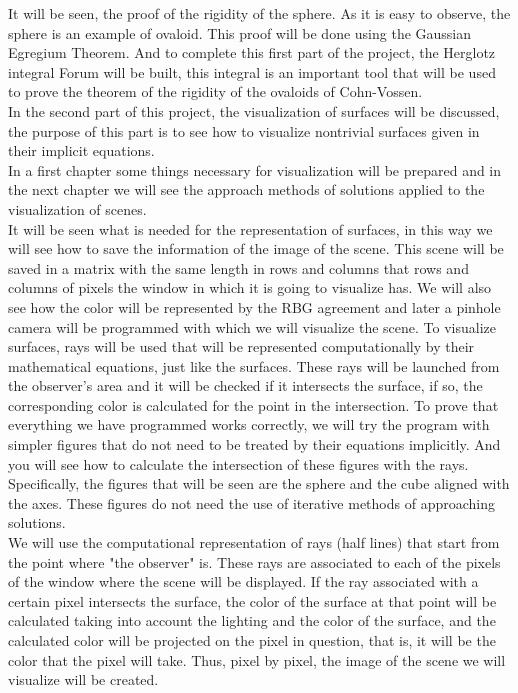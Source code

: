 It will be seen, the proof of the rigidity of the sphere. As it is easy to observe, the sphere is an example of ovaloid. This proof will be done using the Gaussian Egregium Theorem. And to complete this first part of the project, the Herglotz integral Forum will be built, this integral is an important tool that will be used to prove the theorem of the rigidity of the ovaloids of Cohn-Vossen.
${ }$\\

In the second part of this project, the visualization of surfaces will be discussed, the purpose of this part is to see how to visualize nontrivial surfaces given in their implicit equations.
${ }$\\

In a first chapter some things necessary for visualization will be prepared and in the next chapter we will see the approach methods of solutions applied to the visualization of scenes.
${ }$\\

It will be seen what is needed for the representation of surfaces, in this way we will see how to save the information of the image of the scene. This scene will be saved in a matrix with the same length in rows and columns that rows and columns of pixels the window in which it is going to visualize has. We will also see how the color will be represented by the RBG agreement and later a pinhole camera will be programmed with which we will visualize the scene. To visualize surfaces, rays will be used that will be represented computationally by their mathematical equations, just like the surfaces. These rays will be launched from the observer's area and it will be checked if it intersects the surface, if so, the corresponding color is calculated for the point in the intersection. To prove that everything we have programmed works correctly, we will try the program with simpler figures that do not need to be treated by their equations implicitly. And you will see how to calculate the intersection of these figures with the rays. Specifically, the figures that will be seen are the sphere and the cube aligned with the axes. These figures do not need the use of iterative methods of approaching solutions.
${ }$\\

We will use the computational representation of rays (half lines) that start from the point where "the observer" is. These rays are associated to each of the pixels of the window where the scene will be displayed. If the ray associated with a certain pixel intersects the surface, the color of the surface at that point will be calculated taking into account the lighting and the color of the surface, and the calculated color will be projected on the pixel in question, that is, it will be the color that the pixel will take. Thus, pixel by pixel, the image of the scene we will visualize will be created.
${ }$\\

